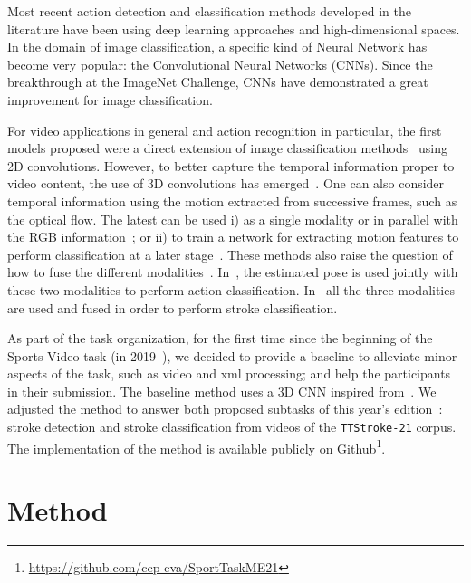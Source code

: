 \documentclass[sigconf]{acmart-me}
\begin{document}
Most recent action detection and classification methods developed in the literature have been using deep learning approaches and high-dimensional spaces. In the domain of image classification, a specific kind of Neural Network has become very popular: the Convolutional Neural Networks (CNNs). Since the breakthrough at the  ImageNet Challenge, CNNs have demonstrated a great improvement for image classification.
\par
For video applications in general and action recognition in particular, the first models proposed were a direct extension of image classification methods~\cite{Hakan:2018, NN:SimonyanTwoStream:2014} using 2D convolutions. However, to better capture the temporal information proper to video content, the use of 3D convolutions has emerged~\citep{NN:3DCNN_first:2007,NN:3DCNN:2017}. One can also consider temporal information using the motion extracted from successive frames, such as the optical flow. The latest can be used i) as a single modality or in parallel with the RGB information~\citep{NN:TwoStream3D:2018, NN:I3DCarreira:2017, NN:SimonyanTwoStream:2014, TT:OFSingularitiesForStrokeClassification:2019}; or ii) to train a network for extracting motion features to perform classification at a later stage~\cite{NN:3DCNNMimiciMotionForCLassification:2019}. These methods also raise the question of how to fuse the different modalities~\citep{NN:TwoStreamFusion:2016, PeThesis2020}. In~\cite{Pose:ActionRecognitionAndPoseEstimation:2018, Pose:LCRNet++:2020}, the estimated pose is used jointly with these two modalities to perform action classification. In~\cite{Pe:3stream:2021} all the three modalities are used and fused in order to perform stroke classification.
\par
As part of the task organization, for the first time since the beginning of the Sports Video task (in 2019~\citep{PeMETask:2019}), we decided to provide a baseline to alleviate minor aspects of the task, such as video and xml processing; and help the participants in their submission. The baseline method uses a 3D CNN inspired from~\cite{PeMEWork:2019,PeCBMI:2018}. We adjusted the method to answer both proposed subtasks of this year's edition~\cite{mediaeval/Martin21/task}: stroke detection and stroke classification from videos of the \texttt{TTStroke-21} corpus. The implementation of the method is available publicly on Github\footnote{\url{https://github.com/ccp-eva/SportTaskME21}}.

\vspace{-5pt}
\section{Method}
\label{sec:dataset}
\end{document}
